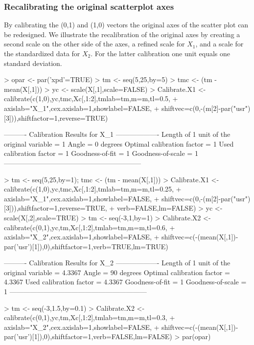 \documentclass[a4paper]{article}
\begin{document}
\subsubsection*{Recalibrating the original scatterplot axes}

By calibrating the (0,1) and (1,0) vectors the original axes of the scatter plot can be 
redesigned. We illustrate the recalibration of the original axes by creating a second scale on
the other side of the axes, a refined scale for $X_1$, and a scale for the standardized data for
$X_2$. For the latter calibration one unit equals one standard deviation. 

\begin{Schunk}
\begin{Sinput}
> opar <- par('xpd'=TRUE)
> tm <- seq(5,25,by=5)
> tmc <- (tm - mean(X[,1]))
> yc <- scale(X[,1],scale=FALSE)
> Calibrate.X1 <- calibrate(c(1,0),yc,tmc,Xc[,1:2],tmlab=tm,m=m,tl=0.5,
+                           axislab="X_1",cex.axislab=1,showlabel=FALSE,
+ shiftvec=c(0,-(m[2]-par("usr")[3])),shiftfactor=1,reverse=TRUE)
\end{Sinput}
\begin{Soutput}
---------- Calibration Results for  X_1  -------------------
Length of 1 unit of the original variable =  1  
Angle                                     =  0 degrees
Optimal calibration factor                =  1  
Used calibration factor                   =  1  
Goodness-of-fit                           =  1  
Goodness-of-scale                         =  1  
------------------------------------------------------------
\end{Soutput}
\begin{Sinput}
> tm <- seq(5,25,by=1); tmc <- (tm - mean(X[,1]))
> Calibrate.X1 <- calibrate(c(1,0),yc,tmc,Xc[,1:2],tmlab=tm,m=m,tl=0.25,
+                           axislab="X_1",cex.axislab=1,showlabel=FALSE,
+ shiftvec=c(0,-(m[2]-par("usr")[3])),shiftfactor=1,reverse=TRUE,
+                           verb=FALSE,lm=FALSE)
> yc <- scale(X[,2],scale=TRUE)
> tm <- seq(-3,1,by=1)
> Calibrate.X2 <- calibrate(c(0,1),yc,tm,Xc[,1:2],tmlab=tm,m=m,tl=0.6,
+                           axislab="X_2",cex.axislab=1,showlabel=FALSE,
+ shiftvec=c(-(mean(X[,1])-par('usr')[1]),0),shiftfactor=1,verb=TRUE,lm=TRUE)
\end{Sinput}
\begin{Soutput}
---------- Calibration Results for  X_2  -------------------
Length of 1 unit of the original variable =  4.3367  
Angle                                     =  90 degrees
Optimal calibration factor                =  4.3367  
Used calibration factor                   =  4.3367  
Goodness-of-fit                           =  1  
Goodness-of-scale                         =  1  
------------------------------------------------------------
\end{Soutput}
\begin{Sinput}
> tm <- seq(-3,1.5,by=0.1)
> Calibrate.X2 <- calibrate(c(0,1),yc,tm,Xc[,1:2],tmlab=tm,m=m,tl=0.3,
+                           axislab="X_2",cex.axislab=1,showlabel=FALSE,
+ shiftvec=c(-(mean(X[,1])-par('usr')[1]),0),shiftfactor=1,verb=FALSE,lm=FALSE)
> par(opar)
\end{Sinput}
\end{Schunk}
\end{document}

